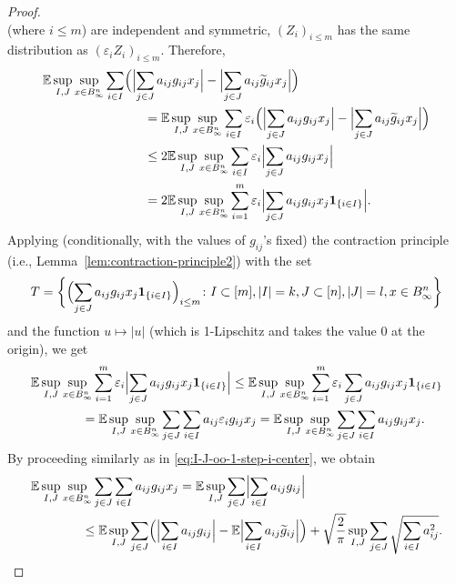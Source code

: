 \documentclass[a4paper]{amsart}
\theoremstyle{definition}
\theoremstyle{remark}
\numberwithin{equation}{section}
\newcommand*{\EE}{\mathbb{E}}
\newcommand*{\ind}{\mathbf{1}} %
\begin{document}
\begin{proof}
\[	\]
	(where $i\leq m$)
	are independent and symmetric, $(Z_i)_{i\le m}$ has the same distribution as $(\varepsilon_iZ_i)_{i\le m}$. Therefore,
 \begin{align}	
 	\MoveEqLeft[8]
	 	 \EE \sup_{I, J} \sup_{x\in B_\infty^n} \sum_{i\in I} \Bigl( \Bigl| \sum_{j\in J} a_{ij} g_{ij} x_j \Bigr|  -  \Bigl| \sum_{j\in J} a_{ij} \widetilde{g}_{ij} x_j \Bigr|\Bigr) \nonumber\\
 	 &= 	 \EE \sup_{I, J} \sup_{x\in B_\infty^n} \sum_{i\in I} \varepsilon_i \Bigl( \Bigl| \sum_{j\in J} a_{ij} g_{ij} x_j \Bigr|  -  \Bigl| \sum_{j\in J} a_{ij} \widetilde{g}_{ij} x_j \Bigr|\Bigr) \nonumber\\ 	
 	 &\leq 	2 \EE \sup_{I, J} \sup_{x\in B_\infty^n} \sum_{i\in I} \varepsilon_i \Bigl| \sum_{j\in J} a_{ij} g_{ij} x_j \Bigr|  \nonumber\\
 	 &= 	2 \EE \sup_{I, J} \sup_{x\in B_\infty^n} \sum_{i=1}^m \varepsilon_i \Bigl| \sum_{j\in J} a_{ij} g_{ij} x_j \ind_{\{i\in I\}}\Bigr| .
 	 	\label{eq:I-J-oo-1-step-ii-symm}  	 	
 \end{align}
Applying (conditionally, with the values of $g_{ij}$'s fixed) the contraction principle (i.e., Lemma~\ref{lem:contraction-principle2}) with  the set 
\[
	T=\biggl\{\Bigl(\sum_{j\in J} a_{ij} g_{ij} x_j \ind_{\{i\in I\}}\Bigr)_{i\le m} \colon I\subset [m], |I|=k, J\subset [n], |J|=l, x\in B_\infty^n \biggr\}
\]
and the function $u\mapsto |u|$ (which is 1-Lipschitz and takes the value $0$ at the origin), we get
  \begin{align}	\label{eq:I-J-oo-1-step2.5} \nonumber
 	\MoveEqLeft[4]
 	\EE \sup_{I, J} \sup_{x\in B_\infty^n} \sum_{i=1}^m \varepsilon_i \Bigl| \sum_{j\in J} a_{ij} g_{ij} x_j \ind_{\{i\in I\}}\Bigr|  
 	\leq
	\EE \sup_{I, J} \sup_{x\in B_\infty^n} \sum_{i=1}^m \varepsilon_i \sum_{j\in J} a_{ij} g_{ij} x_j \ind_{\{i\in I\}}
	\\
	&= \EE \sup_{I, J} \sup_{x\in B_\infty^n}\sum_{j\in J}  \sum_{i\in I} a_{ij}  \varepsilon_i g_{ij} x_j
	 = \EE \sup_{I, J} \sup_{x\in B_\infty^n}\sum_{j\in J}  \sum_{i\in I} a_{ij}  g_{ij} x_j .
\end{align}
By proceeding similarly as in \eqref{eq:I-J-oo-1-step-i-center}, we obtain
\begin{align}
\MoveEqLeft[4]
 	\EE \sup_{I, J} \sup_{x\in B_\infty^n}\sum_{j\in J}  \sum_{i\in I} a_{ij}  g_{ij} x_j
 	= \EE \sup_{I, J} \sum_{j\in J}  \Bigl| \sum_{i\in I} a_{ij}  g_{ij} \Bigr|\nonumber \\
 	&\leq  \EE \sup_{I, J}  \sum_{j\in J} \Bigl( \Bigl| \sum_{i\in I} a_{ij} g_{ij} \Bigr|  - \EE  \Bigl| \sum_{i\in I} a_{ij} \widetilde{g}_{ij}  \Bigr|\Bigr) + \sqrt{\frac{2}{\pi}} \sup_{I, J} \sum_{j\in J} \sqrt{\sum_{i\in I} a_{ij}^2} .
 	\label{eq:I-J-oo-1-step-iii-contraction}
 \end{align}
 

\end{proof}
\end{document}
